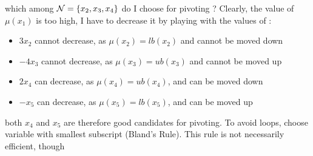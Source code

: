 \begin{frame}
\begin{columns}
  \end{columns}
  \vfill
  which among $\mathcal{N} = \{ x_2, x_3, x_4 \}$ do I choose for pivoting ? Clearly, the value of $\mu(x_1)$
  is too high, I have to decrease it by playing with the values of \nonbas: \pause
  \begin{itemize}
    \item $  3 x_2$ cannot decrease, as $\mu(x_2) = lb(x_2)$ and cannot be moved down \pause
    \item $- 4 x_3$ cannot decrease, as $\mu(x_3) = ub(x_3)$ and cannot be moved up \pause
    \item $  2 x_4$ can decrease, as  $\mu(x_4) = ub(x_4)$, and can be moved down \pause
    \item $-   x_5$ can decrease, as  $\mu(x_5) = lb(x_5)$, and can be moved up
  \end{itemize}
  \vfill\pause
  both $x_4$ and $x_5$ are therefore good candidates for pivoting. To avoid loops, 
  choose variable with smallest subscript (Bland's Rule). This rule is not necessarily
  efficient, though

\end{frame}


